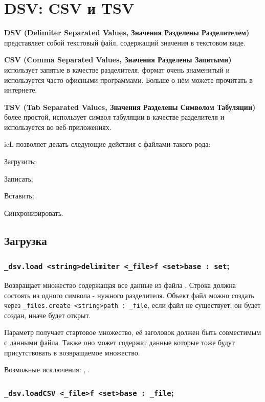 \section{DSV: CSV и TSV}

{\bf DSV (Delimiter Separated Values, Значения Разделены Разделителем)} представляет собой текстовый файл, содержащий значения в текстовом виде.

{\bf CSV (Comma Separated Values, Значения Разделены Запятыми)} использует запятые в качестве разделителя, формат очень знаменитый и используется часто офисными программами. Больше о нём можете прочитать в интернете.

{\bf TSV (Tab Separated Values, Значения Разделены Символом Табуляции)} более простой, использует символ табуляции в качестве разделителя и используется во веб-приложениях.

icL позволяет делать следующие действия с файлами такого рода:
\begin{icItems}
	\item Загрузить;
	\item Записать;
	\item Вставить;
	\item Синхронизировать.
\end{icItems}

\subsection{Загрузка}

\subsubsection{\lstinline|_dsv.load <string>delimiter <_file>f <set>base : set|;}

Возвращает множество содержащая все данные из файла . Строка  должна состоять из одного символа - нужного разделителя. Объект файл можно создать через \lstinline|_files.create <string>path : _file|, если файл не существует, он будет создан, иначе будет открыт.

Параметр  получает стартовое множество, её заголовок должен быть совместимым с данными файла. Также оно может содержат данные которые тоже будут присутствовать в возвращаемое множество. 

Возможные исключения: , .

\subsubsection{\lstinline|_dsv.loadCSV <_file>f <set>base : _file|;}

